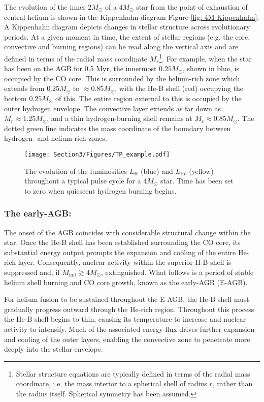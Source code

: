 The evolution of the inner $2M_{\odot}$ of a $4M_{\odot}$ star from the point of exhaustion of central helium is shown in the Kippenhahn diagram Figure \ref{fig: 4M Kippenhahn}. A Kippenhahn diagram depicts changes in stellar structure across evolutionary periods. At a given moment in time, the extent of stellar regions (e.g. the core, convective and burning regions) can be read along the vertical axis and are defined in terms of the radial mass coordinate $M_r$\footnote{Stellar structure equations are typically defined in terms of the radial mass coordinate, i.e. the mass interior to a spherical shell of radius $r$, rather than the radius itself. Spherical symmetry has been assumed.}. For example, when the star has been on the AGB for 0.5 Myr, the innermost $0.25M_{\odot}$, shown in blue, is occupied by the CO core. This is surrounded by the helium-rich zone which extends from $0.25M_{\odot}$ to $\approx0.85M_{\odot}$, with the He-B shell (red) occupying the bottom $0.25M_{\odot}$ of this. The entire region external to this is occupied by the outer hydrogen envelope. The convective layer extends as far down as $M_r\approx1.25M_{\odot}$, and a thin hydrogen-burning shell remains at $M_r\approx0.85M_{\odot}$. The dotted green line indicates the mass coordinate of the boundary between hydrogen- and helium-rich zones.


\begin{figure}[t]
    \centering
    \texttt{[image: Section3/Figures/TP\_example.pdf]}
    \caption{The evolution of the luminosities $L_{\mathrm{H}}$ (blue) and $L_{\mathrm{He}}$ (yellow) throughout a typical pulse cycle for a $4M_{\odot}$ star. Time has been set to zero when quiescent hydrogen burning begins.}
    \label{fig: 4M TP}
\end{figure}

\subsubsection*{The early-AGB:}
The onset of the AGB coincides with considerable structural change within the star. Once the He-B shell has been established surrounding the CO core, its substantial energy output prompts the expansion and cooling of the entire He-rich layer. Consequently, nuclear activity within the superior H-B shell is suppressed and, if $M_{\mathrm{init}}\gtrsim4M_{\odot}$, extinguished. What follows is a period of stable helium shell burning and CO core growth, known as the early-AGB (E-AGB).


For helium fusion to be sustained throughout the E-AGB, the He-B shell must gradually progress outward through the He-rich region. Throughout this process the He-B shell begins to thin, causing its temperature to increase and nuclear activity to intensify. Much of the associated energy-flux drives further expansion and cooling of the outer layers, enabling the convective zone to penetrate more deeply into the stellar envelope.





